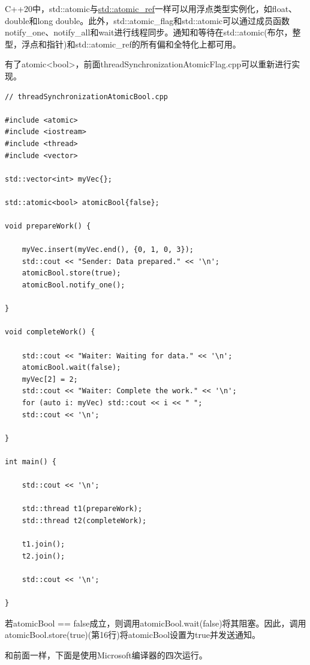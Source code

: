 
C++20中，std::atomic与\href{https://en.cppreference.com/w/cpp/atomic/atomic}{std::atomic\_ref}一样可以用浮点类型实例化，如float、double和long double。此外，std::atomic\_flag和std::atomic可以通过成员函数notify\_one、notify\_all和wait进行线程同步。通知和等待在std::atomic(布尔，整型，浮点和指针)和std::atomic\_ref的所有偏和全特化上都可用。

有了atomic<bool>，前面threadSynchronizationAtomicFlag.cpp可以重新进行实现。

\begin{lstlisting}[style=styleCXX]
// threadSynchronizationAtomicBool.cpp

#include <atomic>
#include <iostream>
#include <thread>
#include <vector>

std::vector<int> myVec{};

std::atomic<bool> atomicBool{false};

void prepareWork() {

	myVec.insert(myVec.end(), {0, 1, 0, 3});
	std::cout << "Sender: Data prepared." << '\n';
	atomicBool.store(true);
	atomicBool.notify_one();

}

void completeWork() {

	std::cout << "Waiter: Waiting for data." << '\n';
	atomicBool.wait(false);
	myVec[2] = 2;
	std::cout << "Waiter: Complete the work." << '\n';
	for (auto i: myVec) std::cout << i << " ";
	std::cout << '\n';

}

int main() {

	std::cout << '\n';
	
	std::thread t1(prepareWork);
	std::thread t2(completeWork);
	
	t1.join();
	t2.join();
	
	std::cout << '\n';

}
\end{lstlisting}

若atomicBool == false成立，则调用atomicBool.wait(false)将其阻塞。因此，调用atomicBool.store(true)(第16行)将atomicBool设置为true并发送通知。

和前面一样，下面是使用Microsoft编译器的四次运行。

